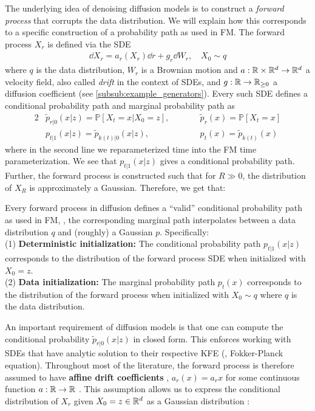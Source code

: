 \documentclass{fairmeta}
\newcommand{\highlight}[1]{{\color{metablue} \textbf{#1}}}
\numberwithin{equation}{section}
\begin{document}
The underlying idea of denoising diffusion models is to construct a \emph{forward process} that corrupts the data distribution. We will explain how this corresponds to a specific construction of a probability path as used in FM. The forward process $X_r$ is defined via the SDE
\begin{align}
\label{eq:forward_process}
    \dd X_r = a_r(X_r)\dd r + g_r\dd W_r,\quad X_0\sim q
\end{align}
where $q$ is the data distribution, $W_r$ is a Brownian motion and $a:\mathbb{R}\times \mathbb{R}^d\to\mathbb{R}^d$ a velocity field, also called \emph{drift} in the context of SDEs, and $g:\mathbb{R}\to\mathbb{R}_{\geq 0}$ a diffusion coefficient (see \cref{subsub:example_generators}). Every such SDE defines a conditional probability path and marginal probability path as 
\begin{alignat}{2}
\label{eq:sde_defines_prob_path}
    &\tilde{p}_{r|0}(x|z) = \mathbb{P}[X_t=x|X_0=z],\qquad &&\tilde{p}_{r}(x)=\mathbb{P}[X_t=x]\\
    &p_{t|1}(x|z)=\tilde{p}_{k(t)|0}(x|z),&& p_t(x)=\tilde{p}_{k(t)}(x)
\end{alignat}
where in the second line we reparameterized time into the FM time parameterization. We see that $p_{t|1}(x|z)$ gives a conditional probability path. Further, the forward process is constructed such that for $R\gg 0$, the distribution of $X_R$ is approximately a Gaussian. Therefore, we get that:
\begin{myframe}
Every forward process in diffusion defines a ``valid'' conditional probability path as used in FM, \ie, the corresponding marginal path interpolates between a data distribution $q$ and (roughly) a Gaussian $p$. Specifically:\\
(1) \highlight{Deterministic initialization: }The conditional probability path $p_{t|1}(x|z)$ corresponds to the distribution of the forward process SDE when initialized with $X_0=z$.\\
(2) \highlight{Data initialization: }The marginal probability path $p_{t}(x)$ corresponds to the distribution of the forward process when initialized with $X_0\sim q$ where $q$ is the data distribution.\\
\end{myframe}
An important requirement of diffusion models is that one  can compute the conditional probability $\tilde{p}_{r|0}(x|z)$ in closed form. This enforces working with SDEs that have analytic solution to their respective KFE (\ie, Fokker-Planck equation). Throughout most of the literature, the forward process is therefore assumed to have \highlight{affine drift coefficients} \ie, $a_r(x)=a_rx$ for some continuous function $a:\mathbb{R}\to\mathbb{R}$ \citep{song2021sde,karras2022elucidating}. This assumption allows us to express the conditional distribution of $X_r$ given $X_0=z\in\mathbb{R}^d$ as a Gaussian distribution \citep{sarkka2019applied,song2021sde, karras2022elucidating}:
\end{document}
